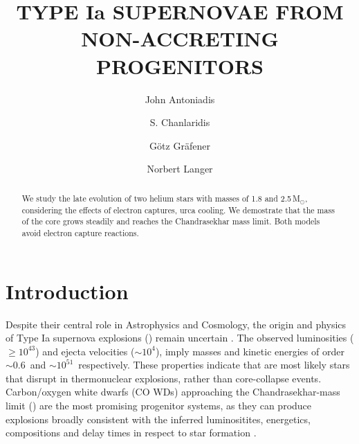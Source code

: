 \documentclass[twocolumn,tighten,times]{aastex62}
\begin{document}
\title{TYPE Ia SUPERNOVAE FROM NON-ACCRETING PROGENITORS}



\author[0000-0002-0786-7307]{John Antoniadis}


\author[0000-0002-9323-9728]{S. Chanlaridis}
\author{G\"{o}tz Gr\"{a}fener}
\author{Norbert Langer}

\begin{abstract}
We study the late evolution of two helium stars with masses of 1.8 and 2.5\,M$_{\odot}$, considering the effects of electron captures, urca cooling. We demostrate that the mass of the core grows steadily and reaches the Chandrasekhar mass limit. Both models avoid electron capture reactions. 
\end{abstract}


\section{Introduction} \label{sec:intro}
 Despite their central role in Astrophysics and Cosmology, 
 the origin and physics of Type Ia supernova explosions (\ias)
remain uncertain  \citep[][]{Maoz:2013hna}. 
The observed luminosities ($\ge 10^{43}$\ergs) and ejecta velocities  
($ \sim 10^{4}$\kms), imply   
masses and kinetic energies of order 
$\sim 0.6$\msun\ and $\sim 10^{51}$\erg\ respectively. 
 These properties indicate that \ias are most likely 
 stars that disrupt in  thermonuclear explosions, 
 rather than core-collapse events. 
 Carbon/oxygen white dwarfs (CO WDs) 
 approaching the Chandrasekhar-mass limit (\mch)
 are the most promising progenitor systems, as they can 
 produce explosions broadly consistent with 
 the inferred luminositites, energetics, 
 compositions and delay times in respect to 
 star formation 
 \citep{Arnett:1969,Nomoto:1982zz,Wang:2012za,Churazov:2014bga}. 
 
\end{document}
